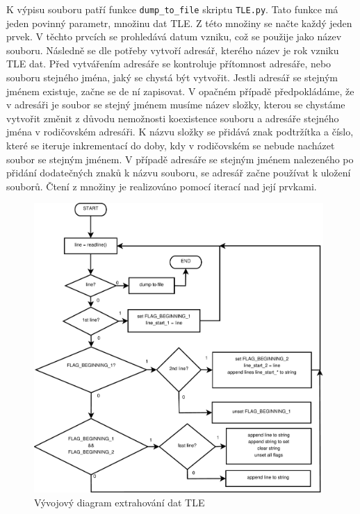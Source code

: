   K výpisu souboru patří funkce \texttt{dump\_to\_file} skriptu \texttt{TLE.py}. Tato funkce má jeden povinný parametr, množinu dat TLE. Z této množiny se načte každý jeden prvek. V těchto prvcích se prohledává datum vzniku, což se použije jako název souboru. Následně se dle potřeby vytvoří adresář, kterého název je rok vzniku TLE dat. Před vytvářením adresáře se kontroluje přítomnost adresáře, nebo souboru stejného jména, jaký se chystá být vytvořit. Jestli adresář se stejným jménem existuje, začne se de ní zapisovat. V opačném případě předpokládáme, že v adresáři je soubor se stejný jménem musíme název složky, kterou se chystáme vytvořit změnit z důvodu nemožnosti koexistence souboru a adresáře stejného jména v rodičovském adresáři. K názvu složky se přidává znak podtržítka a číslo, které se iteruje inkrementací do doby, kdy v rodičovském se nebude nacházet soubor se stejným jménem. V případě adresáře se stejným jménem nalezeného po přidání dodatečných znaků k názvu souboru, se adresář začne používat k uložení souborů. Čtení z množiny je realizováno pomocí iterací nad její prvkami.

%  
  \begin{figure}[ht]
    \centering
    \includegraphics[width=0.98\textwidth]{./obrazky/TLE.pdf}
    \caption{Vývojový diagram extrahování dat TLE}
    \label{fig:TLE_flow}
  \end{figure}

